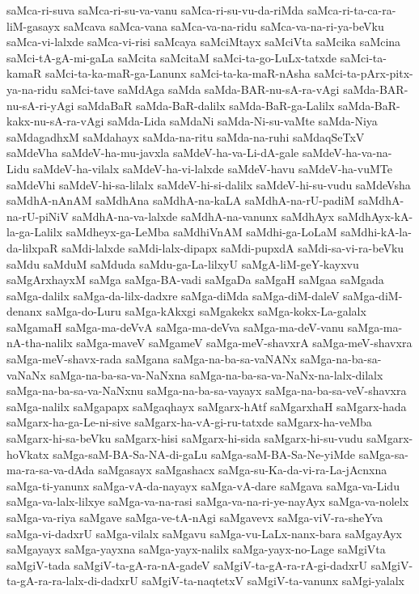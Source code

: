 {saMca-ri-suva
saMca-ri-su-va-vanu
saMca-ri-su-vu-da-riMda
saMca-ri-ta-ca-ra-liM-gasayx
saMcava
saMca-vana
saMca-va-na-ridu
saMca-va-na-ri-ya-beVku
saMca-vi-lalxde
saMca-vi-risi
saMcaya
saMciMtayx
saMciVta
saMcika
saMcina
saMci-tA-gA-mi-gaLa
saMcita
saMcitaM
saMci-ta-go-LuLx-tatxde
saMci-ta-kamaR
saMci-ta-ka-maR-ga-Lanunx
saMci-ta-ka-maR-nAsha
saMci-ta-pArx-pitx-ya-na-ridu
saMci-tave
saMdAga
saMda
saMda-BAR-nu-sA-ra-vAgi
saMda-BAR-nu-sA-ri-yAgi
saMdaBaR
saMda-BaR-dalilx
saMda-BaR-ga-Lalilx
saMda-BaR-kakx-nu-sA-ra-vAgi
saMda-Lida
saMdaNi
saMda-Ni-su-vaMte
saMda-Niya
saMdagadhxM
saMdahayx
saMda-na-ritu
saMda-na-ruhi
saMdaqSeTxV
saMdeVha
saMdeV-ha-mu-javxla
saMdeV-ha-va-Li-dA-gale
saMdeV-ha-va-na-Lidu
saMdeV-ha-vilalx
saMdeV-ha-vi-lalxde
saMdeV-havu
saMdeV-ha-vuMTe
saMdeVhi
saMdeV-hi-sa-lilalx
saMdeV-hi-si-dalilx
saMdeV-hi-su-vudu
saMdeVsha
saMdhA-nAnAM
saMdhAna
saMdhA-na-kaLA
saMdhA-na-rU-padiM
saMdhA-na-rU-piNiV
saMdhA-na-va-lalxde
saMdhA-na-vanunx
saMdhAyx
saMdhAyx-kA-la-ga-Lalilx
saMdheyx-ga-LeMba
saMdhiVnAM
saMdhi-ga-LoLaM
saMdhi-kA-la-da-lilxpaR
saMdi-lalxde
saMdi-lalx-dipapx
saMdi-pupxdA
saMdi-sa-vi-ra-beVku
saMdu
saMduM
saMduda
saMdu-ga-La-lilxyU
saMgA-liM-geY-kayxvu
saMgArxhayxM
saMga
saMga-BA-vadi
saMgaDa
saMgaH
saMgaa
saMgada
saMga-dalilx
saMga-da-lilx-dadxre
saMga-diMda
saMga-diM-daleV
saMga-diM-denanx
saMga-do-Luru
saMga-kAkxgi
saMgakekx
saMga-kokx-La-galalx
saMgamaH
saMga-ma-deVvA
saMga-ma-deVva
saMga-ma-deV-vanu
saMga-ma-nA-tha-nalilx
saMga-maveV
saMgameV
saMga-meV-shavxrA
saMga-meV-shavxra
saMga-meV-shavx-rada
saMgana
saMga-na-ba-sa-vaNANx
saMga-na-ba-sa-vaNaNx
saMga-na-ba-sa-va-NaNxna
saMga-na-ba-sa-va-NaNx-na-lalx-dilalx
saMga-na-ba-sa-va-NaNxnu
saMga-na-ba-sa-vayayx
saMga-na-ba-sa-veV-shavxra
saMga-nalilx
saMgapapx
saMgaqhayx
saMgarx-hAtf
saMgarxhaH
saMgarx-hada
saMgarx-ha-ga-Le-ni-sive
saMgarx-ha-vA-gi-ru-tatxde
saMgarx-ha-veMba
saMgarx-hi-sa-beVku
saMgarx-hisi
saMgarx-hi-sida
saMgarx-hi-su-vudu
saMgarx-hoVkatx
saMga-saM-BA-Sa-NA-di-gaLu
saMga-saM-BA-Sa-Ne-yiMde
saMga-sa-ma-ra-sa-va-dAda
saMgasayx
saMgashacx
saMga-su-Ka-da-vi-ra-La-jAcnxna
saMga-ti-yanunx
saMga-vA-da-nayayx
saMga-vA-dare
saMgava
saMga-va-Lidu
saMga-va-lalx-lilxye
saMga-va-na-rasi
saMga-va-na-ri-ye-nayAyx
saMga-va-nolelx
saMga-va-riya
saMgave
saMga-ve-tA-nAgi
saMgavevx
saMga-viV-ra-sheYva
saMga-vi-dadxrU
saMga-vilalx
saMgavu
saMga-vu-LaLx-nanx-bara
saMgayAyx
saMgayayx
saMga-yayxna
saMga-yayx-nalilx
saMga-yayx-no-Lage
saMgiVta
saMgiV-tada
saMgiV-ta-gA-ra-nA-gadeV
saMgiV-ta-gA-ra-rA-gi-dadxrU
saMgiV-ta-gA-ra-ra-lalx-di-dadxrU
saMgiV-ta-naqtetxV
saMgiV-ta-vanunx
saMgi-yalalx
}
